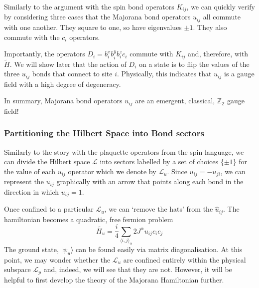 Similarly to the argument with the spin bond operators \(K_{ij}\), we can quickly verify by considering three cases that the Majorana bond operators \(u_{ij}\) all commute with one another. They square to one, so have eigenvalues \(\pm 1\). They also commute with the \(c_i\) operators.

Importantly, the operators \(D_i = b^x_i b^y_i b^z_i c_i\) commute with \(K_{ij}\) and, therefore, with \(\tilde{H}\). We will show later that the action of \(D_i\) on a state is to flip the values of the three \(u_{ij}\) bonds that connect to site \(i\). Physically, this indicates that \(u_{ij}\) is a gauge field with a high degree of degeneracy.

In summary, Majorana bond operators \(u_{ij}\) are an emergent, classical, \(\mathbb{Z_2}\) gauge field!

\hypertarget{partitioning-the-hilbert-space-into-bond-sectors}{%
\subsubsection{Partitioning the Hilbert Space into Bond sectors}\label{partitioning-the-hilbert-space-into-bond-sectors}}

Similarly to the story with the plaquette operators from the spin language, we can divide the Hilbert space \(\mathcal{L}\) into sectors labelled by a set of choices \(\{\pm 1\}\) for the value of each \(u_{ij}\) operator which we denote by \(\mathcal{L}_u\). Since \(u_{ij} = -u_{ji}\), we can represent the \(u_{ij}\) graphically with an arrow that points along each bond in the direction in which \(u_{ij} = 1\).

Once confined to a particular \(\mathcal{L}_u\), we can `remove the hats' from the \(\hat{u}_{ij}\). The hamiltonian becomes a quadratic, free fermion problem \[\tilde{H_u} =  \frac{i}{4} \sum_{\langle i,j\rangle_\alpha} 2J^{\alpha} u_{ij} c_i c_j\] The ground state, \(|\psi_u\rangle\) can be found easily via matrix diagonalisation. At this point, we may wonder whether the \(\mathcal{L}_u\) are confined entirely within the physical subspace \(\mathcal{L}_p\) and, indeed, we will see that they are not. However, it will be helpful to first develop the theory of the Majorana Hamiltonian further.


